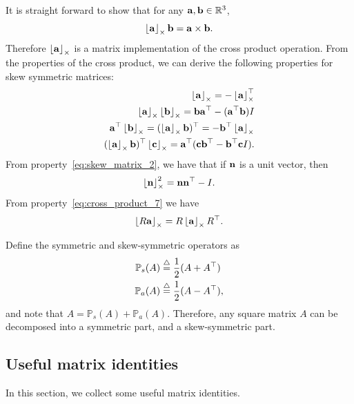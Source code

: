 It is straight forward to show that for any $\mathbf{a},\mathbf{b}\in\mathbb{R}^3$, 
\[
\left\lfloor\mathbf{a}\right\rfloor_{\times}\mathbf{b} = \mathbf{a}\times\mathbf{b}.
\]
Therefore $\left\lfloor\mathbf{a}\right\rfloor_{\times}$ is a matrix implementation of the cross product operation.
From the properties of the cross product, we can derive the following properties for skew symmetric matrices:
\begin{align}
\ss{\abf} = -\ss{\abf}^\top \label{eq:skew_matrix_1}\\
\ss{\abf}\ss{\bbf} = \bbf\abf^\top - (\abf^\top\bbf)I \label{eq:skew_matrix_2}\\
\abf^\top\ss{\bbf} = (\ss{\abf}\bbf)^\top = -\bbf^\top\ss{\abf} \label{eq:skew_matrix_3}\\
(\ss{\abf}\bbf)^\top\ss{\cbf} = \abf^\top(\cbf\bbf^\top-\bbf^\top\cbf I).\label{eq:skew_matrix_4}
\end{align}
From property~\eqref{eq:skew_matrix_2}, we have that if $\mathbf{n}$ is a unit vector, then
\begin{equation}\label{eq:skew_matrix_5}
\ss{\nbf}^2 = \nbf\nbf^\top-I.
\end{equation}
From property~\eqref{eq:cross_product_7} we have
\begin{equation}\label{eq:skew_matrix_6}
\ss{R\abf} = R\ss{\abf}R^\top.
\end{equation}

Define the symmetric and skew-symmetric operators as
\begin{align}
\mathbb{P}_s (A) &\defeq \frac{1}{2}(A+A^\top) \label{eq:symmetric_operator} \\
\mathbb{P}_a (A) &\defeq \frac{1}{2}(A-A^\top), \label{eq:skew_symmetric_operator}
\end{align}
and note that $A=\mathbb{P}_s(A)+\mathbb{P}_a(A)$.  Therefore, any square matrix $A$ can be decomposed into a symmetric part, and a skew-symmetric part.

\subsection{Useful matrix identities}
In this section, we collect some useful matrix identities.

